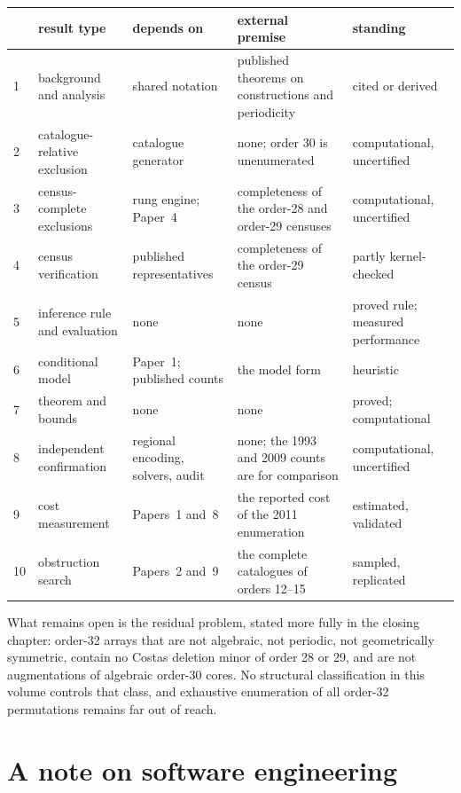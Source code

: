 \documentclass[11pt,a4paper,oneside]{report}
\theoremstyle{definition}
\begin{document}
\begin{center}
\small
\begin{tabular}{@{}p{}>{\raggedright\arraybackslash}p{}>{\raggedright\arraybackslash}p{}>{\raggedright\arraybackslash}p{}>{\raggedright\arraybackslash}p{}@{}}
\toprule
& result type & depends on & external premise & standing \\
\midrule
1 & background and analysis & shared notation & published theorems on constructions and periodicity & cited or derived \\
2 & catalogue-relative exclusion & catalogue generator & none; order 30 is unenumerated & computational, uncertified \\
3 & census-complete exclusions & rung engine; Paper~4 & completeness of the order-28 and order-29 censuses & computational, uncertified \\
4 & census verification & published representatives & completeness of the order-29 census & partly kernel-checked \\
5 & inference rule and evaluation & none & none & proved rule; measured performance \\
6 & conditional model & Paper~1; published counts & the model form & heuristic \\
7 & theorem and bounds & none & none & proved; computational \\
8 & independent confirmation & regional encoding, solvers, audit & none; the 1993 and 2009 counts are for comparison & computational, uncertified \\
9 & cost measurement & Papers~1 and~8 & the reported cost of the 2011 enumeration & estimated, validated \\
10 & obstruction search & Papers~2 and~9 & the complete catalogues of orders 12--15 & sampled, replicated \\
\bottomrule
\end{tabular}
\end{center}

What remains open is the residual problem, stated more fully in the closing chapter: order-32 arrays that are not algebraic, not periodic,
not geometrically symmetric, contain no Costas deletion minor of order 28 or 29, and are not
augmentations of algebraic order-30 cores. No structural classification in this volume controls
that class, and exhaustive enumeration of all order-32 permutations remains far out of reach.


\chapter*{A note on software engineering}
\end{document}
